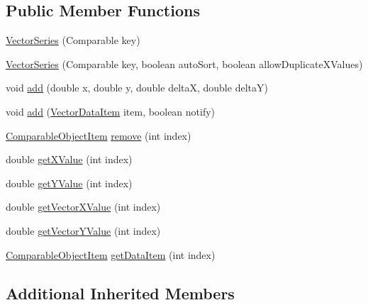 \subsection*{Public Member Functions}
\begin{DoxyCompactItemize}
\item 
\mbox{\hyperlink{classorg_1_1jfree_1_1data_1_1xy_1_1_vector_series_a08fc85c340c33a6c8e6c4daa232bc494}{Vector\+Series}} (Comparable key)
\item 
\mbox{\hyperlink{classorg_1_1jfree_1_1data_1_1xy_1_1_vector_series_ad589521330fb16d21384fd5f61d90756}{Vector\+Series}} (Comparable key, boolean auto\+Sort, boolean allow\+Duplicate\+X\+Values)
\item 
void \mbox{\hyperlink{classorg_1_1jfree_1_1data_1_1xy_1_1_vector_series_aec338f197384b6d807f8686cc24cb5f7}{add}} (double x, double y, double deltaX, double deltaY)
\item 
void \mbox{\hyperlink{classorg_1_1jfree_1_1data_1_1xy_1_1_vector_series_a44bf481df41430ea34792e58a2ad0643}{add}} (\mbox{\hyperlink{classorg_1_1jfree_1_1data_1_1xy_1_1_vector_data_item}{Vector\+Data\+Item}} item, boolean notify)
\item 
\mbox{\hyperlink{classorg_1_1jfree_1_1data_1_1_comparable_object_item}{Comparable\+Object\+Item}} \mbox{\hyperlink{classorg_1_1jfree_1_1data_1_1xy_1_1_vector_series_ab5cfdd6aeb9d395ba04156654e1c30a0}{remove}} (int index)
\item 
double \mbox{\hyperlink{classorg_1_1jfree_1_1data_1_1xy_1_1_vector_series_a332b301b787037795ade0d6f619e1dda}{get\+X\+Value}} (int index)
\item 
double \mbox{\hyperlink{classorg_1_1jfree_1_1data_1_1xy_1_1_vector_series_a4d67a2291d74f07835369d579fc6909e}{get\+Y\+Value}} (int index)
\item 
double \mbox{\hyperlink{classorg_1_1jfree_1_1data_1_1xy_1_1_vector_series_ab3fe72017d4383a94620bb705cfb57eb}{get\+Vector\+X\+Value}} (int index)
\item 
double \mbox{\hyperlink{classorg_1_1jfree_1_1data_1_1xy_1_1_vector_series_a955aedde3f6bf7bfb7bc71331ab3f438}{get\+Vector\+Y\+Value}} (int index)
\item 
\mbox{\hyperlink{classorg_1_1jfree_1_1data_1_1_comparable_object_item}{Comparable\+Object\+Item}} \mbox{\hyperlink{classorg_1_1jfree_1_1data_1_1xy_1_1_vector_series_afd8e83d6d9386825e82295beac5465a6}{get\+Data\+Item}} (int index)
\end{DoxyCompactItemize}
\subsection*{Additional Inherited Members}


